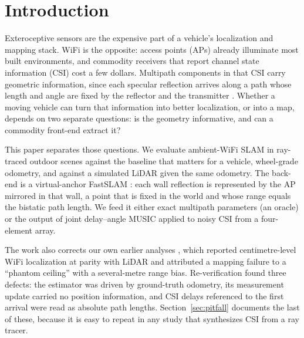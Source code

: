 \documentclass[preprint,12pt]{elsarticle}
\begin{document}
\section{Introduction}\label{sec:intro}

Exteroceptive sensors are the expensive part of a vehicle's localization and mapping stack.
WiFi is the opposite: access points (APs) already illuminate most built environments, and
commodity receivers that report channel state information (CSI) cost a few dollars. Multipath
components in that CSI carry geometric information, since each specular reflection arrives
along a path whose length and angle are fixed by the reflector and the transmitter
\cite{leitinger2015jsac,gentner2016channelslam}. Whether a moving vehicle can turn that
information into better localization, or into a map, depends on two separate questions: is the
geometry informative, and can a commodity front-end extract it?

This paper separates those questions. We evaluate ambient-WiFi SLAM in ray-traced outdoor
scenes against the baseline that matters for a vehicle, wheel-grade odometry, and against a
simulated LiDAR given the same odometry. The back-end is a virtual-anchor FastSLAM
\cite{montemerlo2002fastslam}: each wall reflection is represented by the AP mirrored in that
wall, a point that is fixed in the world and whose range equals the bistatic path length. We
feed it either exact multipath parameters (an oracle) or the output of joint delay--angle MUSIC
\cite{schmidt1986music,shan1985smoothing} applied to noisy CSI from a four-element array.

The work also corrects our own earlier analyses \cite{fetna2026wifiradar}, which reported
centimetre-level WiFi localization at parity with LiDAR and attributed a mapping failure to a
``phantom ceiling'' with a several-metre range bias. Re-verification found three defects: the
estimator was driven by ground-truth odometry, its measurement update carried no position
information, and CSI delays referenced to the first arrival were read as absolute path lengths.
Section~\ref{sec:pitfall} documents the last of these, because it is easy to repeat in any
study that synthesizes CSI from a ray tracer.
\end{document}
